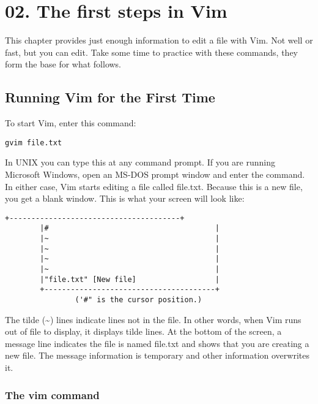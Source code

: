 \section{02. The first steps in Vim}
This chapter provides just enough information to edit a file with Vim.  Not
well or fast, but you can edit.  Take some time to practice with these
commands, they form the base for what follows.
\localtableofcontents
\subsection{Running Vim for the First Time}
To start Vim, enter this command:

\begin{Verbatim}[samepage=true]
 gvim file.txt
\end{Verbatim}

In UNIX you can type this at any command prompt.
If you are running Microsoft Windows, open an MS-DOS prompt window and enter the command.
In either case, Vim starts editing a file called file.txt.
Because this is a new file, you get a blank window.
This is what your screen will look like:

\begin{Verbatim}[samepage=true]
		+---------------------------------------+
		|#                                      |
		|~                                      |
		|~                                      |
		|~                                      |
		|~                                      |
		|"file.txt" [New file]                  |
		+---------------------------------------+
				('#" is the cursor position.)
\end{Verbatim}

The tilde (\textasciitilde) lines indicate lines not in the file.
In other words, when Vim runs out of file to display, it displays tilde lines.
At the bottom of the screen, a message line indicates the file is named file.txt and shows that you are creating a new file.
The message information is temporary and other information overwrites it.

\subsubsection{The vim command}

